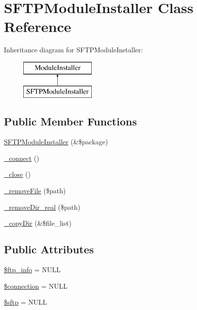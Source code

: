 \hypertarget{classSFTPModuleInstaller}{}\section{S\+F\+T\+P\+Module\+Installer Class Reference}
\label{classSFTPModuleInstaller}
Inheritance diagram for S\+F\+T\+P\+Module\+Installer\+:\begin{figure}[H]
\begin{center}
\leavevmode
\includegraphics[height=2.000000cm]{classSFTPModuleInstaller}
\end{center}
\end{figure}
\subsection*{Public Member Functions}
\begin{DoxyCompactItemize}
\item 
\hyperlink{classSFTPModuleInstaller_ae2ab80c52793052af4aeb66bc1b8910b}{S\+F\+T\+P\+Module\+Installer} (\&\$package)
\item 
\hyperlink{classSFTPModuleInstaller_a50b67d17519fb8e86aa5c44031daa63f}{\+\_\+connect} ()
\item 
\hyperlink{classSFTPModuleInstaller_a6f2c54d7303968d97d1026a00ba0961a}{\+\_\+close} ()
\item 
\hyperlink{classSFTPModuleInstaller_abd1dd628941e99ee3ab526cf19cc7d54}{\+\_\+remove\+File} (\$path)
\item 
\hyperlink{classSFTPModuleInstaller_a2acd47768689f3b71562bfc5f53ea888}{\+\_\+remove\+Dir\+\_\+real} (\$path)
\item 
\hyperlink{classSFTPModuleInstaller_a57832797085ca931efd64c1080186e49}{\+\_\+copy\+Dir} (\&\$file\+\_\+list)
\end{DoxyCompactItemize}
\subsection*{Public Attributes}
\begin{DoxyCompactItemize}
\item 
\hyperlink{classSFTPModuleInstaller_a9c6b08191ecc35a10ed025b02d337b41}{\$ftp\+\_\+info} = N\+U\+LL
\item 
\hyperlink{classSFTPModuleInstaller_a469153f66f7c46047f51a6e99cd560ba}{\$connection} = N\+U\+LL
\item 
\hyperlink{classSFTPModuleInstaller_aafcf5a295a98403473988943b073838c}{\$sftp} = N\+U\+LL
\end{DoxyCompactItemize}


